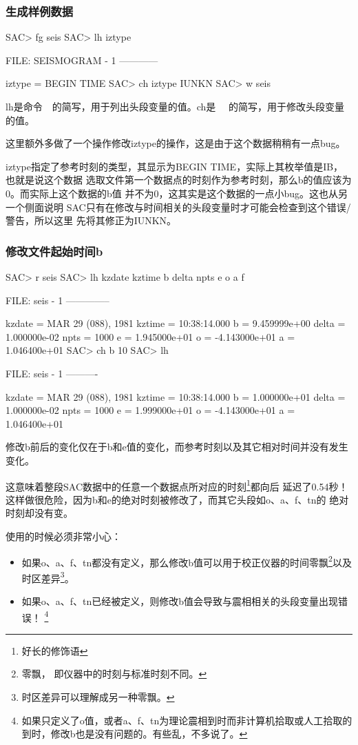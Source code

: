 \subsubsection{生成样例数据}
\begin{SACCode}
SAC> fg seis
SAC> lh iztype

  FILE: SEISMOGRAM - 1
   ------------

    iztype = BEGIN TIME
SAC> ch iztype IUNKN
SAC> w seis
\end{SACCode}
lh是命令~~的简写，用于列出头段变量的值。ch是~~
的简写，用于修改头段变量的值。

这里额外多做了一个操作修改iztype的操作，这是由于这个数据稍稍有一点bug。

iztype指定了参考时刻的类型，其显示为BEGIN TIME，实际上其枚举值是IB，也就是说这个数据
选取文件第一个数据点的时刻作为参考时刻，那么b的值应该为0。而实际上这个数据的b值
并不为0，这其实是这个数据的一点小bug。这也从另一个侧面说明
SAC只有在修改与时间相关的头段变量时才可能会检查到这个错误/警告，所以这里
先将其修正为IUNKN。

\subsubsection{修改文件起始时间b}
\begin{SACCode}
SAC> r seis
SAC> lh kzdate kztime b delta npts e o a f
  
  FILE: seis - 1
 --------------

     kzdate = MAR 29 (088), 1981
     kztime = 10:38:14.000
          b = 9.459999e+00
      delta = 1.000000e-02
       npts = 1000
          e = 1.945000e+01
          o = -4.143000e+01
          a = 1.046400e+01
SAC> ch b 10
SAC> lh
  
  FILE: seis - 1
   ----------

     kzdate = MAR 29 (088), 1981
     kztime = 10:38:14.000
          b = 1.000000e+01
      delta = 1.000000e-02
       npts = 1000
          e = 1.999000e+01
          o = -4.143000e+01
          a = 1.046400e+01
\end{SACCode}

修改b前后的变化仅在于b和e值的变化，而参考时刻以及其它相对时间并没有发生变化。

这意味着整段SAC数据中的任意一个数据点所对应的时刻\footnote{好长的修饰语}都向后
延迟了0.54秒！这样做很危险，因为b和e的绝对时刻被修改了，而其它头段如o、a、f、tn的
绝对时刻却没有变。

使用的时候必须非常小心：
\begin{itemize}
\item 如果o、a、f、tn都没有定义，那么修改b值可以用于校正仪器的时间零飘\footnote{零飘，
    即仪器中的时刻与标准时刻不同。}以及时区差异\footnote{时区差异可以理解成另一种零飘。}。
\item 如果o、a、f、tn已经被定义，则修改b值会导致与震相相关的头段变量出现错误！
    \footnote{如果只定义了o值，或者a、f、tn为理论震相到时而非计算机拾取或人工拾取的
    到时，修改b也是没有问题的。有些乱，不多说了。}
\end{itemize}

